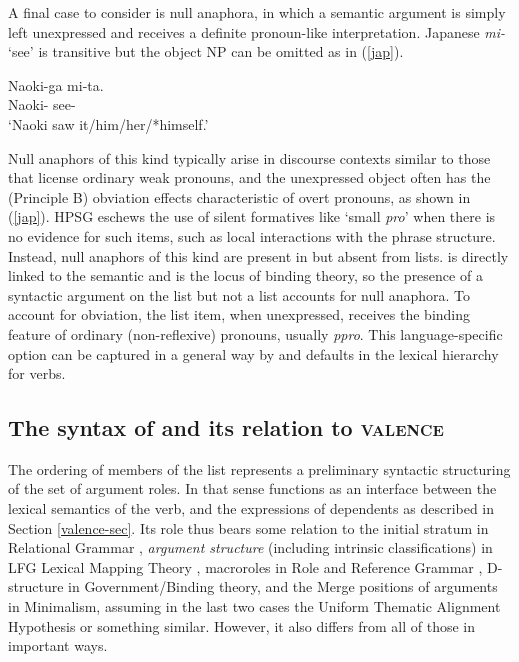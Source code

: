 \documentclass[output=paper
                ,modfonts
                ,nonflat
	        ,collection
	        ,collectionchapter
	        ,collectiontoclongg
 	        ,biblatex
                ,babelshorthands
                ,newtxmath
                ,draftmode
                ,colorlinks, citecolor=brown
]{./langsci/langscibook}
\begin{document}
A final case to consider is null anaphora, in which a semantic argument is simply left unexpressed and receives a definite pronoun-like interpretation.  Japanese \textit{mi-} `see' is transitive but the object NP can be omitted as in (\ref{jap}).

\begin{exe}
	\ex\label{jap}
		\gll Naoki-ga mi-ta.  \\
		Naoki- see-  \\
		\glt `Naoki saw it/him/her/*himself.'
\end{exe} 

\noindent
Null anaphors of this kind typically arise in discourse contexts similar to those that license ordinary weak pronouns, and the unexpressed object often has the (Principle B) obviation effects characteristic of overt pronouns,  as shown in (\ref{jap}).  HPSG eschews the use of silent formatives like `small \textit{pro}' when there is no evidence for such items, such as local interactions with the phrase structure.  Instead, null anaphors of this kind are present in \argst but absent from \val lists.  \argst is directly linked to the semantic \content and is the locus of binding theory, so the presence of a syntactic argument on the \argst list but not a \val list
 accounts for null anaphora.  To account for obviation, the \argst list item, when unexpressed, receives the binding feature of ordinary (non-reflexive) pronouns, usually \textit{ppro}.  This language-specific option can be captured in a general way by \val and \argst defaults in the lexical hierarchy for verbs.   

\subsection{The syntax of \argst and its relation to \textsc{valence}}
\label{argst-sec}


The ordering of members of the \argst list represents a preliminary syntactic structuring of the set of argument roles.  In that sense \argst functions as an interface between the lexical semantics of the verb, and the expressions of dependents as described in Section \ref{valence-sec}.  Its role thus bears some relation to the initial stratum in Relational Grammar \citep{PerlmutterandPostal1984},  \textit{argument structure} (including intrinsic classifications) in LFG Lexical Mapping Theory  \citep{Bresnan+etal:2015}, macroroles in Role and Reference Grammar \citep{VanValinandLapolla1997}, D-structure in Government/Binding theory, and the Merge positions of arguments in Minimalism,  assuming in the last two cases the Uniform Thematic Alignment Hypothesis \citep{Baker1988} or something similar.  However, it also differs from all of those in important ways.  
\end{document}
